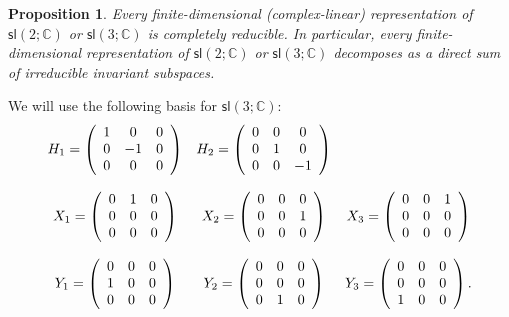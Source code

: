 \documentclass[12pt]{amsbook}
\theoremstyle{plain}
\newtheorem{proposition}[theorem]{Proposition}
\numberwithin{equation}{chapter}
\numberwithin{theorem}{chapter}
\begin{document}
\begin{proposition}
\label{reduce.sl3}Every finite-dimensional (complex-linear) representation of
$\mathsf{sl}(2;\mathbb{C})$ or $\mathsf{sl}\left(  3;\mathbb{C}\right)  $ is
completely reducible. In particular, every finite-dimensional representation
of $\mathsf{sl}(2;\mathbb{C})$ or $\mathsf{sl}\left(  3;\mathbb{C}\right)  $
decomposes as a direct sum of irreducible invariant subspaces.
\end{proposition}

We will use the following basis for $\mathsf{sl}\left(  3;\mathbb{C}\right)
$:
\[%
\begin{array}
[c]{ccc}%
H_{1}=\left(
\begin{array}
[c]{ccc}%
1 & 0 & 0\\
0 & -1 & 0\\
0 & 0 & 0
\end{array}
\right)  & H_{2}=\left(
\begin{array}
[c]{ccc}%
0 & 0 & 0\\
0 & 1 & 0\\
0 & 0 & -1
\end{array}
\right)  & \\
&  & \\
X_{1}=\left(
\begin{array}
[c]{ccc}%
0 & 1 & 0\\
0 & 0 & 0\\
0 & 0 & 0
\end{array}
\right)  & X_{2}=\left(
\begin{array}
[c]{ccc}%
0 & 0 & 0\\
0 & 0 & 1\\
0 & 0 & 0
\end{array}
\right)  & X_{3}=\left(
\begin{array}
[c]{ccc}%
0 & 0 & 1\\
0 & 0 & 0\\
0 & 0 & 0
\end{array}
\right) \\
&  & \\
Y_{1}=\left(
\begin{array}
[c]{ccc}%
0 & 0 & 0\\
1 & 0 & 0\\
0 & 0 & 0
\end{array}
\right)  & Y_{2}=\left(
\begin{array}
[c]{ccc}%
0 & 0 & 0\\
0 & 0 & 0\\
0 & 1 & 0
\end{array}
\right)  & Y_{3}=\left(
\begin{array}
[c]{ccc}%
0 & 0 & 0\\
0 & 0 & 0\\
1 & 0 & 0
\end{array}
\right)  \text{.}%
\end{array}
\]
\end{document}
